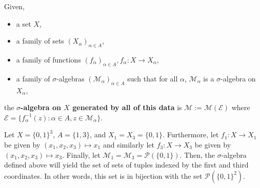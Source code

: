 \documentclass[11pt,leqno,oneside]{amsbook}
\numberwithin{thm}{section}
\renewcommand{\P}{\mathcal{P}} %
\newcommand{\M}{\mathcal{M}} %
\newcommand{\Ep}{\mathcal{E}} %
\newcommand{\s}{$\sigma$-} %
\renewcommand{\de}{\textbf} %
\begin{document}
\begin{defn}\label{gen-sigma-alg-product}
  Given,
  \begin{itemize}
  \item a set $X$,
  \item a family of sets $(X_\alpha)_{\alpha \in A}$,
  \item a family of functions $(f_\alpha)_{\alpha \in A}, f_\alpha: X
    \to X_\alpha$,
  \item a family of \s algebras $(\M_\alpha)_{\alpha \in A}$ such
    that for all $\alpha$, $\M_\alpha$ is a \s algebra on
    $X_\alpha$,
  \end{itemize}
  the \de{\s algebra on $X$ generated by all of this data} is
  $\M := \M(\Ep)$ where $\Ep = \{f_\alpha^{-1}(z) : \alpha \in A, z \in
  \M_\alpha\}$.
\end{defn}
\begin{example}
  Let $X = \{0,1\}^3$, $A = \{1,3\}$, and $X_1 = X_3 =
  \{0,1\}$. Furthermore, let $f_1\colon  X \to X_1$ be given by
  $(x_1,x_2,x_3) \mapsto x_1$ and similarly let $f_3\colon  X \to X_3$ be given by $(x_1,x_2,x_3) \mapsto x_3$. Finally, let
  $\M_1 = \M_3 = \P(\{0,1\})$. Then, the \s algebra defined
  above will yield the set of sets of tuples indexed by the first and
  third coordinates. In other words, this set is in bijection with the
  set $\P(\{0,1\}^2)$.
\end{example}
\end{document}
